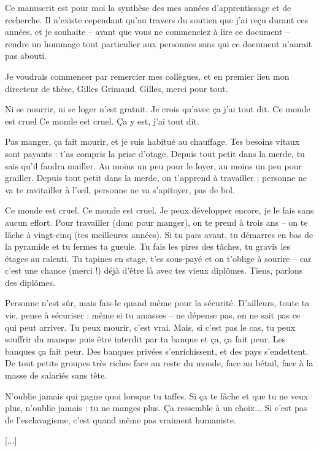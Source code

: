 Ce manuscrit est pour moi la synthèse des mes années d'apprentissage et de recherche. Il n'existe cependant qu'au travers du soutien que j'ai reçu durant ces années, et je souhaite -- avant que vous ne commenciez à lire ce document -- rendre un hommage tout particulier aux personnes sans qui ce document n'aurait pas abouti.

Je voudrais commencer par remercier mes collègues, et en premier lieu mon directeur de thèse, Gilles Grimaud. Gilles, merci pour tout. 

{\color{white}
Ni se nourrir, ni se loger n'est gratuit.
Je crois qu'avec ça j'ai tout dit.
Ce monde est cruel
Ce monde est cruel.
Ça y est, j'ai tout dit.

Pas manger, ça fait mourir, et je suis habitué au chauffage.
Tes besoins vitaux sont payants : t'as compris la prise d'otage.
Depuis tout petit dans la merde, tu sais qu'il faudra mailler.
Au moins un peu pour le loyer, au moins un peu pour grailler.
Depuis tout petit dans la merde, on t'apprend à travailler ;
personne ne va te ravitailler à l'œil,
personne ne va s'apitoyer, pas de bol.

Ce monde est cruel.
Ce monde est cruel.
Je peux développer encore, je le fais sans aucun effort.
Pour travailler (donc pour manger), on te prend à trois ans
-- on te lâche à vingt-cinq (tes meilleures années).
Si tu pars avant, tu démarres en bas de la pyramide
et tu fermes ta gueule. Tu fais les pires des tâches,
tu gravis les étages au ralenti. Tu tapines en stage,
t'es sous-payé et on t'oblige à sourire --
car c'est une chance (merci !) déjà d'être là
avec tes vieux diplômes. Tiens, parlons des diplômes.

Personne n'est sûr, mais fais-le quand même pour la sécurité.
D'ailleurs, toute ta vie, pense à sécuriser :
même si tu amasses -- ne dépense pas,
on ne sait pas ce qui peut arriver.
Tu peux mourir, c'est vrai. Mais, si c'est pas le cas,
tu peux souffrir du manque puis être interdit par ta banque
et ça, ça fait peur. Les banques ça fait peur.
Des banques privées s'enrichissent, et des pays s'endettent.
De tout petits groupes très riches face au reste du monde,
face au bétail, face à la masse de salariés sans tête.

N'oublie jamais qui gagne quoi lorsque tu taffes.
Si ça te fâche et que tu ne veux plus,
n'oublie jamais : tu ne manges plus.
Ça ressemble à un choix...
Si c'est pas de l'esclavagisme,
c'est quand même pas vraiment humaniste.

[...]

}
